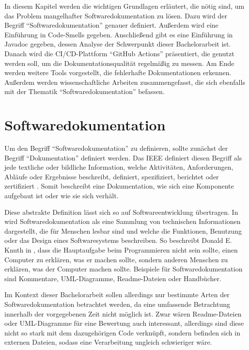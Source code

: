 \label{sec:background}
In diesem Kapitel werden die wichtigen Grundlagen erläutert, die nötig sind, um das Problem mangelhafter Softwaredokumentation zu lösen.  Dazu  wird der Begriff \enquote{Softwaredokumentation} genauer definiert. Außerdem wird eine Einführung in Code-Smells gegeben.  Anschließend gibt es eine Einführung in Javadoc gegeben, dessen Analyse der Schwerpunkt dieser Bachelorarbeit ist. Danach wird die \ac{CI/CD}-Plattform \enquote{GitHub Actions} präsentiert, die genutzt werden soll, um die Dokumentationsqualität regelmäßig zu messen. Am Ende werden weitere Tools vorgestellt, die fehlerhafte Dokumentationen erkennen. Außerdem werden wissenschaftliche Arbeiten zusammengefasst, die sich ebenfalls mit der Thematik \enquote{Softwaredokumentation} befassen. 
 

\hfill
\section{Softwaredokumentation}\label{chapter:documentation}
Um den Begriff \enquote{Softwaredokumentation} zu definieren, sollte zunächst der Begriff \enquote{Dokumentation} definiert werden. Das IEEE  definiert diesen Begriff als jede textliche oder bildliche Information, welche Aktivitäten, Anforderungen, Abläufe oder Ergebnisse beschreibt, definiert, spezifiziert, berichtet oder zertifiziert \cite[S. 28]{IEEEStandardGlossaryofSoftwareEngineeringTerminology}. Somit beschreibt eine Dokumentation, wie sich eine Komponente aufgebaut ist oder wie sie sich verhält.

Diese abstrakte Definition lässt sich so auf Softwareentwicklung übertragen. In \cite[S. 125]{Softwaredocumentationandstandards} wird Softwaredokumentation als eine Sammlung von technischen Informationen dargestellt, die für Menschen lesbar sind und welche die Funktionen, Benutzung oder das Design eines Softwaresystems beschreiben. So beschreibt Donald E. Knuth in \cite[S. 97]{LiterateProgramming}, dass die Hauptaufgabe beim Programmieren nicht sein sollte, einen Computer zu erklären, was er machen sollte, sondern anderen Menschen zu erklären, was der Computer machen sollte. Beispiele für Softwaredokumentation sind Kommentare,  UML-Diagramme, Readme-Dateien oder Handbücher.

Im Kontext dieser Bachelorarbeit sollen allerdings nur bestimmte Arten der Softwaredokumentation betrachtet werden, da eine umfassende Betrachtung innerhalb der vorgegebenen Zeit nicht möglich ist.  Zwar wären Readme-Dateien oder UML-Diagramme für eine Bewertung auch interessant, allerdings sind diese nicht so stark mit dem dazugehörigen Code verknüpft, sondern befinden sich in externen Dateien, sodass eine Verarbeitung ungleich schwieriger wäre.

